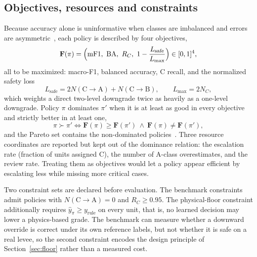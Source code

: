 \documentclass[journal]{IEEEtran}
\newcommand{\Lsafe}{L_{\mathrm{safe}}}
\begin{document}
\subsection{Objectives, resources and constraints}
\label{sec:objectives}
Because accuracy alone is uninformative when classes are imbalanced and errors are asymmetric~\cite{Saito2015}, each policy is described by four objectives,
\begin{equation}
\mathbf F(\pi)=\Bigl(\mathrm{mF1},\ \mathrm{BA},\ R_C,\ 1-\frac{\Lsafe}{L_{\max}}\Bigr)\in[0,1]^4,
\label{eq:objectives}
\end{equation}
all to be maximized: macro-F1, balanced accuracy, C recall, and the normalized safety loss
\begin{equation}
\Lsafe=2N(\mathrm{C}\rightarrow\mathrm{A})+N(\mathrm{C}\rightarrow\mathrm{B}),\qquad L_{\max}=2N_C,
\label{eq:safeloss}
\end{equation}
which weights a direct two-level downgrade twice as heavily as a one-level downgrade. Policy $\pi$ dominates $\pi'$ when it is at least as good in every objective and strictly better in at least one,
\begin{equation}
\pi\succ\pi'\iff\mathbf F(\pi)\geq\mathbf F(\pi')\ \wedge\ \mathbf F(\pi)\neq\mathbf F(\pi'),
\label{eq:dominance}
\end{equation}
and the Pareto set contains the non-dominated policies~\cite{Deb}. Three resource coordinates are reported but kept out of the dominance relation: the escalation rate (fraction of units assigned C), the number of A-class overestimates, and the review rate. Treating them as objectives would let a policy appear efficient by escalating less while missing more critical cases.

Two constraint sets are declared before evaluation. The benchmark constraints admit policies with $N(\mathrm{C}\rightarrow\mathrm{A})=0$ and $R_C\geq0.95$. The physical-floor constraint additionally requires $\hat y_\pi\geq y_{\mathrm{rule}}$ on every unit, that is, no learned decision may lower a physics-based grade. The benchmark can measure whether a downward override is correct under its own reference labels, but not whether it is safe on a real levee, so the second constraint encodes the design principle of Section~\ref{sec:floor} rather than a measured cost.
\end{document}
